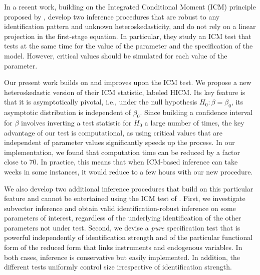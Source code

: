 \documentclass[12pt]{article}
\newcommand{\1}{\mathbf{1}}
\begin{document}
In a recent work, building on the Integrated Conditional Moment (ICM)
 principle  proposed by \cite{Bierens82},
\cite{antoine_identification-robust_2023} develop
two inference procedures that are robust to any identification pattern
and unknown heteroskedasticity, and do not rely on a linear projection
in the first-stage equation. In particular, they study an ICM test
that tests at the same time for the value of the parameter and the
specification of the model.  However, critical values should be
simulated for each value of the parameter.

Our present work builds on and improves upon the ICM test.  We
 propose a new heteroskedastic version of their ICM statistic, labeled
 HICM. Its key feature is that it is asymptotically pivotal, i.e.,
 under the null hypothesis $H_0:
\beta=\beta_{0}$, its asymptotic distribution is independent of
$\beta_0$. Since building a confidence interval for $\beta$ involves
inverting a test statistic for $H_0$ a large number of times,
the key advantage of our test is computational, as using critical
values that are independent of parameter values significantly speeds
up the process. In our implementation, we found that computation time
can be reduced by a factor  close to 70. In practice, this means
that when ICM-based inference can take weeks in some instances, it
would reduce to a few hours with our new procedure.

We also develop two additional inference procedures that build on this
particular feature and cannot be entertained using the ICM test of
\cite{antoine_identification-robust_2023}.  First, we investigate
subvector inference and obtain valid identification-robust inference
on some parameters of interest, regardless of the underlying
identification of the other parameters not under test. Second, we
devise a {\em pure} specification test that is powerful independently
of identification strength and of the particular functional form of
the reduced form that links instruments and endogenous variables.  In
both cases, inference is conservative but easily implemented.  In
addition, the different tests uniformly control size irrespective of
identification strength.
\end{document}
